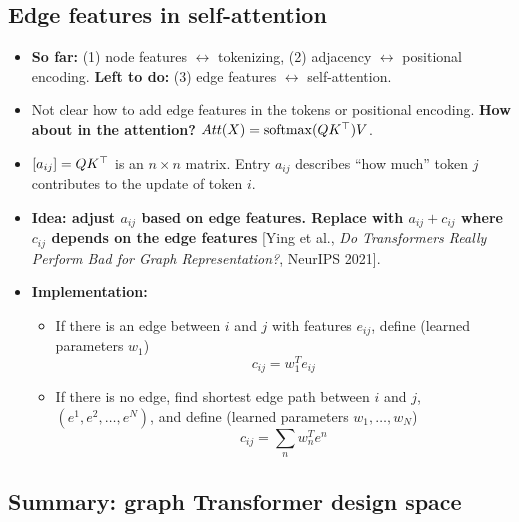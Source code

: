 \subsection{Edge features in self-attention}\label{sec:lec08-edge}

\begin{itemize}
  \item \textbf{So far:} (1) node features $\leftrightarrow$ tokenizing,
    (2) adjacency $\leftrightarrow$ positional encoding. \textbf{Left to do:}
    (3) edge features $\leftrightarrow$ self-attention.
  \item Not clear how to add edge features in the tokens or positional
    encoding. \textbf{How about in the attention?} $Att(X)=\operatorname{softmax}(QK^{\top})V$.
  \item $[a_{ij}] = QK^{\top}$ is an $n\times n$ matrix. Entry $a_{ij}$ describes
    ``how much'' token $j$ contributes to the update of token $i$.
  \item \textbf{Idea: adjust $a_{ij}$ based on edge features. Replace with
    $a_{ij}+c_{ij}$ where $c_{ij}$ depends on the edge features} [Ying et al.,
    \emph{Do Transformers Really Perform Bad for Graph Representation?},
    NeurIPS 2021].
  \item \textbf{Implementation:}
    \begin{itemize}
      \item If there is an edge between $i$ and $j$ with features $e_{ij}$,
        define (learned parameters $w_1$)
        \begin{equation}\label{eq:lec08-cedge}
          c_{ij} = w_1^T e_{ij}
        \end{equation}
      \item If there is no edge, find shortest edge path between $i$ and $j$,
        $(e^1, e^2,\dots,e^N)$, and define (learned parameters
        $w_1,\dots,w_N$)
        \begin{equation}\label{eq:lec08-cpath}
          c_{ij} = \sum_n w_n^T e^n
        \end{equation}
    \end{itemize}
\end{itemize}

\subsection{Summary: graph Transformer design space}\label{sec:lec08-summary-ds}


